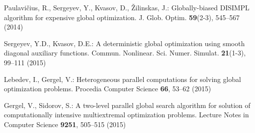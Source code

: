 \documentclass{llncs}
\begin{document}
\begin{thebibliography}{10}
Paulavi\v{c}ius, R., Sergeyev, Y., Kvasov, D., \v{Z}ilinskas, J.: Globally-biased DISIMPL algorithm for expensive global optimization. J. Glob. Optim. \textbf{59}(2-3), 545--567 (2014)

Sergeyev, Y.D., Kvasov, D.E.: A deterministic global optimization using smooth diagonal auxiliary functions. Commun. Nonlinear. Sci. Numer. Simulat. \textbf{21}(1-3), 99--111 (2015)

Lebedev, I., Gergel, V.: Heterogeneous parallel computations for solving global optimization problems. Procedia Computer Science \textbf{66}, 53--62 (2015)

Gergel, V., Sidorov, S.: A two-level parallel global search algorithm for solution of computationally intensive multiextremal optimization problems. Lecture Notes in Computer Science  \textbf{9251}, 505--515 (2015)


\end{thebibliography}
\end{document}
